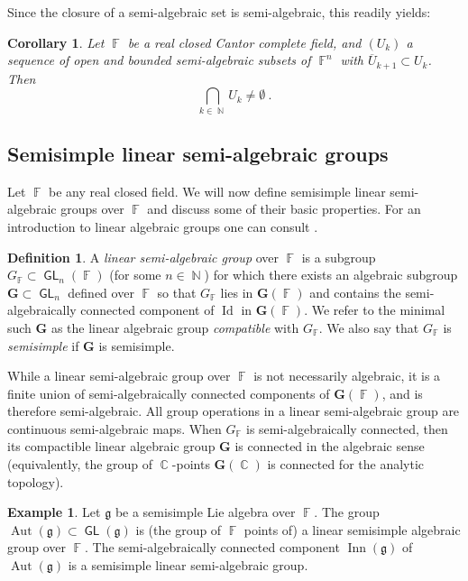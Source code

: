 \documentclass{amsart}
\theoremstyle{plain}
\newtheorem{corollary}[proposition]{Corollary}
\theoremstyle{definition}
\newtheorem{example}[proposition]{Example}
\newtheorem{definition}[proposition]{Definition}
\DeclareMathOperator{\Aut}{Aut}
\DeclareMathOperator{\Id}{Id}
\DeclareMathOperator{\GL}{\mathsf{GL}}
\DeclareMathOperator{\Inn}{Inn}
\DeclareMathOperator{\Cb}{\mathbb{C}}
\DeclareMathOperator{\Fb}{{\mathbb{F}}}
\DeclareMathOperator{\Nb}{{\mathbb{N}}}
\newcommand{\1}{\mathbf{1}}
\begin{document}
Since the closure of a semi-algebraic set is semi-algebraic, this readily yields:

\begin{corollary}
\label{propo:NestedIntersectionPropertyCantorComplete}
    Let $\Fb$ be a real closed Cantor complete field, and $(U_k)$ a sequence of open and bounded semi-algebraic subsets of $\Fb^n$ with $\overline{U}_{k+1}\subset U_k$.
    Then 
    \[\bigcap_{k\in \Nb} U_k \neq \emptyset~.\]
\end{corollary}

\subsection{Semisimple linear semi-algebraic groups}
\label{section:SemiAlgGroups}

Let $\Fb$ be any real closed field. We will now define semisimple linear semi-algebraic groups over $\Fb$ and discuss some of their basic properties.
For an introduction to linear algebraic groups one can consult \cite{borelBook}.

\begin{definition}
\label{dfn: linear semi-algebraic group}
A \emph{linear semi-algebraic group} over $\Fb$ is a subgroup $G_{\Fb}\subset\GL_n(\Fb)$ (for some $n\in\Nb$) for which there exists an algebraic subgroup $\mathbf G\subset\GL_n$ defined over $\Fb$ so that $G_{\Fb}$ lies in $\mathbf{G}(\Fb)$ and contains the semi-algebraically connected component of $\Id$ in $\mathbf G(\Fb)$. We refer to the minimal such $\mathbf G$ as the linear algebraic group \emph{compatible} with $G_{\Fb}$. We also say that $G_{\Fb}$ is \emph{semisimple} if $\mathbf G$ is semisimple. 
\end{definition}

While a linear semi-algebraic group over $\Fb$ is not necessarily algebraic, it is a finite union of semi-algebraically connected components of $\mathbf{G}(\Fb)$, and is therefore semi-algebraic. All group operations in a linear semi-algebraic group are continuous semi-algebraic maps.
When $G_{\Fb}$ is semi-algebraically connected, then its compactible linear algebraic group $\mathbf G$ is connected in the algebraic sense (equivalently, the group of $\Cb$-points $\mathbf{G}(\Cb)$ is connected for the analytic topology).


\begin{example}\label{example: group}
    Let $\mathfrak g$ be a semisimple Lie algebra over $\Fb$. The group $\Aut(\mathfrak g)\subset \GL(\mathfrak g)$ is (the group of $\Fb$ points of) a linear semisimple algebraic group over $\Fb$. The semi-algebraically connected component $\Inn(\mathfrak g)$ of $\Aut(\mathfrak g)$ is a semisimple linear semi-algebraic group. 
\end{example}
\end{document}
